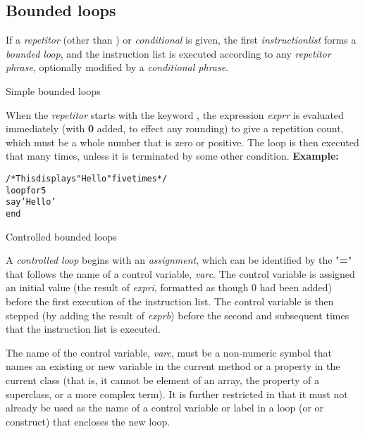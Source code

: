 \subsection{Bounded loops}
 If a \emph{repetitor} (other than ) or
\emph{conditional} is given, the first \emph{instructionlist}
forms a \emph{bounded loop}, and the instruction list is executed
according to any \emph{repetitor phrase}, optionally modified by a
\emph{conditional phrase}.
\begin{description}
\item{Simple bounded loops}

When the \emph{repetitor} starts with the keyword ,
the expression \emph{exprr} is evaluated immediately
(with \textbf{0} added, to effect any rounding) to give a repetition
count, which must be a whole number that is zero or positive.
The loop is then executed that many times, unless it is terminated by
some other condition.
 \textbf{Example:}
\begin{alltt}
/* This displays "Hello" five times */
loop for 5
  say 'Hello'
  end
\end{alltt}
\item{Controlled bounded loops}

A \emph{controlled loop} begins with an \emph{assignment},
which can be identified by the "\textbf{=}" that follows the name
of a control variable, \emph{varc}.
The control variable is assigned an initial value (the result of
\emph{expri}, formatted as though 0 had been added)
before the first execution of the instruction list.
The control variable is then stepped (by adding the result of
\emph{exprb}) before the second and subsequent times that the
instruction list is executed.
 
The name of the control variable, \emph{varc}, must be a non-numeric
symbol that names an existing or new variable in the current method or a
property in the current class (that is, it cannot be element of an
array, the property of a superclass, or a more complex term).  It is
further restricted in that it must not already be used as the name of a
control variable or label in a loop (or  or 
construct) that encloses the new loop.
 

\end{description}
